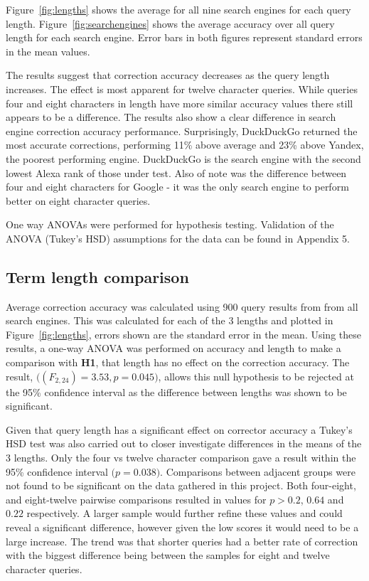 \documentclass{csfourzero}
\begin{document}
Figure~\ref{fig:lengths} shows the average for all nine search engines for each query length. Figure~\ref{fig:searchengines} shows the average accuracy over all query length for each search engine. Error bars in both figures represent standard errors in the mean values.

The results suggest that correction accuracy decreases as the query length increases. The effect is most apparent for twelve character queries. While queries four and eight characters in length have more similar accuracy values there still appears to be a difference. The results also show a clear difference in search engine correction accuracy performance. Surprisingly, DuckDuckGo returned the most accurate corrections, performing 11\% above average and 23\% above Yandex, the poorest performing engine. DuckDuckGo is the search engine with the second lowest Alexa rank of those under test. Also of note was the difference between four and eight characters for Google - it was the only search engine to perform better on eight character queries.

One way ANOVAs were performed for hypothesis testing. Validation of the ANOVA (Tukey's HSD) assumptions for the data can be found in Appendix 5.

\subsection{Term length comparison}
Average correction accuracy was calculated using 900 query results from from all search engines. This was calculated for each of the 3 lengths and plotted in Figure~\ref{fig:lengths}, errors shown are the standard error in the mean. Using these results, a one-way ANOVA was performed on accuracy and length to make a comparison with \textbf{H1}, that length has no effect on the correction accuracy. The result, $\big((F_{2,24}) = 3.53, p = 0.045\big)$, allows this null hypothesis to be rejected at the 95\% confidence interval as the difference between lengths was shown to be significant.

Given that query length has a significant effect on corrector accuracy a Tukey's HSD test was also carried out to closer investigate differences in the means of the 3 lengths. Only the four vs twelve character comparison gave a result within the 95\% confidence interval $\big(p = 0.038\big)$. Comparisons between adjacent groups were not found to be significant on the data gathered in this project. Both four-eight, and eight-twelve pairwise comparisons resulted in values for $p > 0.2$, $0.64$ and $0.22$ respectively. A larger sample would further refine these values and could reveal a significant difference, however given the low scores it would need to be a large increase. The trend was that shorter queries had a better rate of correction with the biggest difference being between the samples for eight and twelve character queries.
\end{document}
